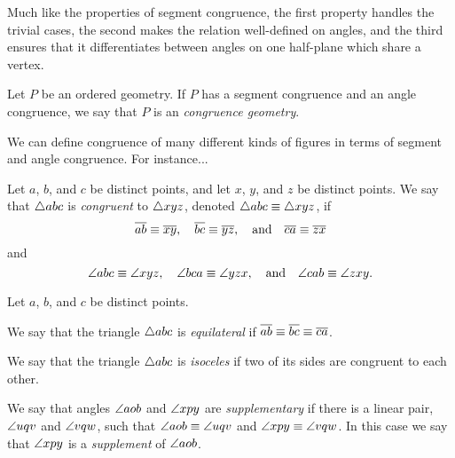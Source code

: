 Much like the properties of segment congruence, the first property handles the trivial cases, the second makes the relation well-defined on angles, and the third ensures that it differentiates between angles on one half-plane which share a vertex.

\begin{dfn}
Let \(P\) be an ordered geometry.
If \(P\) has a segment congruence and an angle congruence, we say that \(P\) is an \emph{congruence geometry}.
\end{dfn}

We can define congruence of many different kinds of figures in terms of segment and angle congruence.
For instance...

\begin{dfn}
Let \(a\), \(b\), and \(c\) be distinct points, and let \(x\), \(y\), and \(z\) be distinct points.
We say that \(\bigtriangleup{abc}\) is \emph{congruent} to \(\bigtriangleup{xyz}\), denoted \(\bigtriangleup{abc} \equiv \bigtriangleup{xyz}\), if \[ \overline{ab} \equiv \overline{xy}, \quad \overline{bc} \equiv \overline{yz}, \quad \mathrm{and} \quad \overline{ca} \equiv \overline{zx} \] and \[ \angle{abc} \equiv \angle{xyz}, \quad \angle{bca} \equiv \angle{yzx}, \quad \mathrm{and} \quad \angle{cab} \equiv \angle{zxy}. \]
\end{dfn}

\begin{dfn}
Let \(a\), \(b\), and \(c\) be distinct points.
\begin{proplist}
\item We say that the triangle \(\bigtriangleup{abc}\) is \emph{equilateral} if \(\overline{ab} \equiv \overline{bc} \equiv \overline{ca}\).
\item We say that the triangle \(\bigtriangleup{abc}\) is \emph{isoceles} if two of its sides are congruent to each other.
\end{proplist}
\end{dfn}


\begin{dfn}
We say that angles \(\angle{aob}\) and \(\angle{xpy}\) are \emph{supplementary} if there is a linear pair, \(\angle{uqv}\) and \(\angle{vqw}\), such that \(\angle{aob} \equiv \angle{uqv}\) and \(\angle{xpy} \equiv \angle{vqw}\).
In this case we say that \(\angle{xpy}\) is a \emph{supplement} of \(\angle{aob}\).
\end{dfn}

